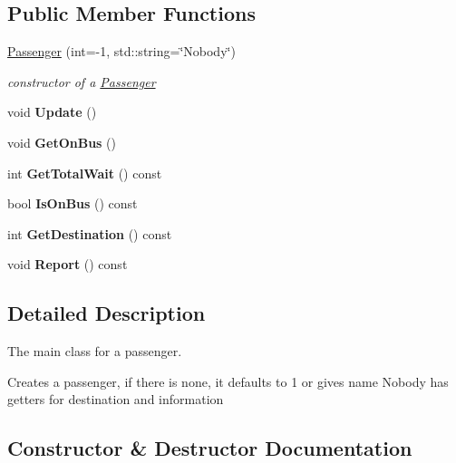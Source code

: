 \subsection*{Public Member Functions}
\begin{DoxyCompactItemize}
\item 
\hyperlink{classPassenger_a5c3addb9a6fd03e5e5642ed844e2702c}{Passenger} (int=-\/1, std\+::string=\char`\"{}Nobody\char`\"{})
\begin{DoxyCompactList}\small\item\em constructor of a \hyperlink{classPassenger}{Passenger} \end{DoxyCompactList}\item 
\mbox{\label{classPassenger_a960de3b29fc17a2c2d79c0b79d5cf299}} 
void {\bfseries Update} ()
\item 
\mbox{\label{classPassenger_ae2ba639cfef39781ac079778578bd9fe}} 
void {\bfseries Get\+On\+Bus} ()
\item 
\mbox{\label{classPassenger_a25158560f790ef7ef06d94c414b34f25}} 
int {\bfseries Get\+Total\+Wait} () const
\item 
\mbox{\label{classPassenger_a2acf008ec444afcc859b914ee24add0e}} 
bool {\bfseries Is\+On\+Bus} () const
\item 
\mbox{\label{classPassenger_a49db0ee527377aae6077df190a11501c}} 
int {\bfseries Get\+Destination} () const
\item 
\mbox{\label{classPassenger_ac54ce797e412a4895febe10f07dc5df5}} 
void {\bfseries Report} () const
\end{DoxyCompactItemize}


\subsection{Detailed Description}
The main class for a passenger. 

Creates a passenger, if there is none, it defaults to 1 or gives name Nobody has getters for destination and information 

\subsection{Constructor \& Destructor Documentation}
\mbox{\label{classPassenger_a5c3addb9a6fd03e5e5642ed844e2702c}} 
